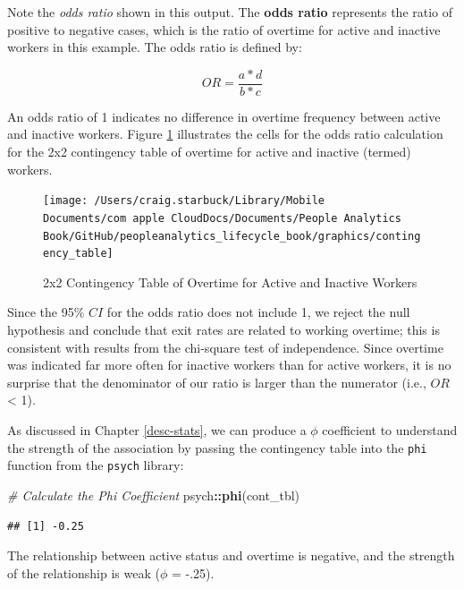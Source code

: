 \documentclass[]{book}
\newenvironment{Shaded}{\begin{snugshade}}{\end{snugshade}}
\newcommand{\CommentTok}[1]{\textcolor[rgb]{0.56,0.35,0.01}{\textit{#1}}}
\newcommand{\KeywordTok}[1]{\textcolor[rgb]{0.13,0.29,0.53}{\textbf{#1}}}
\newcommand{\NormalTok}[1]{#1}
\newcommand{\OperatorTok}[1]{\textcolor[rgb]{0.81,0.36,0.00}{\textbf{#1}}}
\begin{document}
Note the \emph{odds ratio} shown in this output. The \textbf{odds ratio} represents the ratio of positive to negative cases, which is the ratio of overtime for active and inactive workers in this example. The odds ratio is defined by:

\[OR = \frac{a*d}{b*c}\]

An odds ratio of 1 indicates no difference in overtime frequency between active and inactive workers. Figure \ref{fig:contingency-tbl} illustrates the cells for the odds ratio calculation for the 2x2 contingency table of overtime for active and inactive (termed) workers.

\begin{figure}

{\centering \texttt{[image: /Users/craig.starbuck/Library/Mobile Documents/com~apple~CloudDocs/Documents/People Analytics Book/GitHub/peopleanalytics\_lifecycle\_book/graphics/contingency\_table]} 

}

\caption{2x2 Contingency Table of Overtime for Active and Inactive Workers}\label{fig:contingency-tbl}
\end{figure}

Since the 95\% \(CI\) for the odds ratio does not include 1, we reject the null hypothesis and conclude that exit rates are related to working overtime; this is consistent with results from the chi-square test of independence. Since overtime was indicated far more often for inactive workers than for active workers, it is no surprise that the denominator of our ratio is larger than the numerator (i.e., \(OR\) \textless{} 1).

As discussed in Chapter \ref{desc-stats}, we can produce a \(\phi\) coefficient to understand the strength of the association by passing the contingency table into the \texttt{phi} function from the \texttt{psych} library:

\begin{Shaded}
\begin{Highlighting}[]
\CommentTok{# Calculate the Phi Coefficient}
\NormalTok{psych}\OperatorTok{::}\KeywordTok{phi}\NormalTok{(cont_tbl)}
\end{Highlighting}
\end{Shaded}

\begin{verbatim}
## [1] -0.25
\end{verbatim}

The relationship between active status and overtime is negative, and the strength of the relationship is weak (\(\phi\) = -.25).
\end{document}
